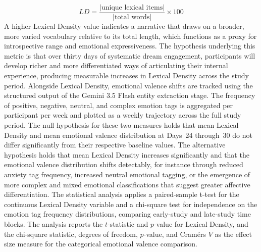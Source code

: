 \documentclass[12pt,a4paper]{report}
\begin{document}
\[
LD = \frac{|\text{unique lexical items}|}{|\text{total words}|} \times 100
\]
A higher Lexical Density value indicates a narrative that draws on a broader, more varied vocabulary relative to its total length, which functions as a proxy for introspective range and emotional expressiveness. The hypothesis underlying this metric is that over thirty days of systematic dream engagement, participants will develop richer and more differentiated ways of articulating their internal experience, producing measurable increases in Lexical Density across the study period. Alongside Lexical Density, emotional valence shifts are tracked using the structured output of the Gemini 3.5 Flash entity extraction stage. The frequency of positive, negative, neutral, and complex emotion tags is aggregated per participant per week and plotted as a weekly trajectory across the full study period. The null hypothesis for these two measures holds that mean Lexical Density and mean emotional valence distribution at Days~\num{24} through~\num{30} do not differ significantly from their respective baseline values. The alternative hypothesis holds that mean Lexical Density increases significantly and that the emotional valence distribution shifts detectably, for instance through reduced anxiety tag frequency, increased neutral emotional tagging, or the emergence of more complex and mixed emotional classifications that suggest greater affective differentiation. The statistical analysis applies a paired-sample t-test for the continuous Lexical Density variable and a chi-square test for independence on the emotion tag frequency distributions, comparing early-study and late-study time blocks. The analysis reports the $t$-statistic and $p$-value for Lexical Density, and the chi-square statistic, degrees of freedom, $p$-value, and Cramér\textquotesingle{}s $V$ as the effect size measure for the categorical emotional valence comparison.
\end{document}
